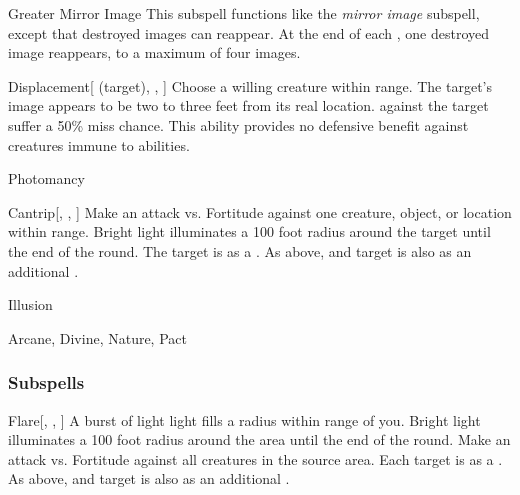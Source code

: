 \begin{ability}[\nth{4}]{Greater Mirror Image}
This subspell functions like the \textit{mirror image} subspell, except that destroyed images can reappear.
At the end of each , one destroyed image reappears, to a maximum of four images.
\end{ability}
\vspace{0.25em}


\begin{ability}[\nth{6}]{Displacement}[ (target), , ]
Choose a willing creature within \rngmed range.
The target's image appears to be two to three feet from its real location.
  against the target suffer a 50\% miss chance.
This ability provides no defensive benefit against creatures immune to  abilities.
\end{ability}
\vspace{0.25em}

\newpage
\begin{spellsection}{Photomancy}


\begin{ability}{Cantrip}[, , ]
Make an attack vs. Fortitude against one creature, object, or location within \rngmed range.
Bright light illuminates a 100 foot radius around the target until the end of the round.
\hit The target is \dazzled as a .
\crit As above, and target is also \dazed as an additional .
\end{ability}




 Illusion

 Arcane, Divine, Nature, Pact
\end{spellsection}


\subsubsection{Subspells}


\begin{ability}[\nth{1}]{Flare}[, , ]
A burst of light light fills a \areasmall radius within \rngmed range of you.
Bright light illuminates a 100 foot radius around the area until the end of the round.
Make an attack vs. Fortitude against all creatures in the source area.
\hit Each target is \dazzled as a .
\crit As above, and target is also \dazed as an additional .
\end{ability}
\vspace{0.25em}


